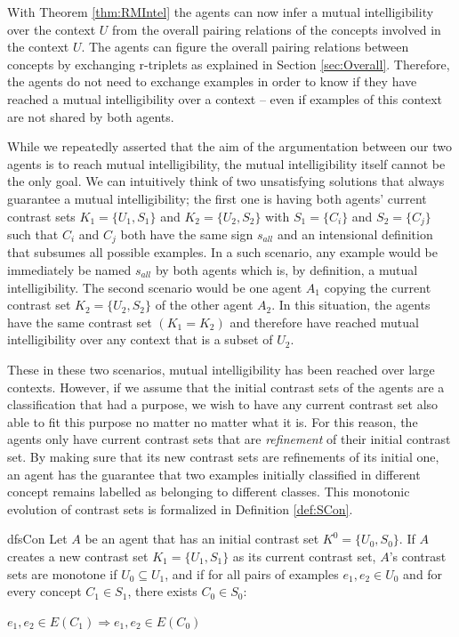 With Theorem \ref{thm:RMIntel} the agents can now infer a mutual intelligibility over the context $U$ from the overall pairing relations of the concepts involved in the context $U$. The agents can figure the overall pairing relations between concepts by exchanging r-triplets as explained in Section \ref{sec:Overall}. Therefore, the agents do not need to exchange examples in order to know if they have reached a mutual intelligibility over a context -- even if examples of this context are not shared by both agents.

While we repeatedly asserted that the aim of the argumentation between our two agents is to reach mutual intelligibility, the mutual intelligibility itself cannot be the only goal. We can intuitively think of two unsatisfying solutions that always guarantee a mutual intelligibility; the first one is having both agents' current contrast sets $K_{1} = \{U_{1}, S_{1} \}$ and $K_{2} = \{U_{2}, S_{2} \}$ with $S_{1} = \{ C_{i} \}$ and $S_{2} = \{ C_{j} \}$ such that $C_{i}$ and $C_{j}$ both have the same sign $s_{all}$ and an intensional definition that subsumes all possible examples. In a such scenario, any example would be immediately be named $s_{all}$ by both agents which is, by definition, a mutual intelligibility. The second scenario would be one agent $A_{1}$ copying the current contrast set $K_{2} = \{U_{2}, S_{2} \}$ of the other agent $A_{2}$. In this situation, the agents have the same contrast set $(K_{1} = K_{2})$ and therefore have reached mutual intelligibility over any context that is a subset of $U_{2}$.

These in these two scenarios, mutual intelligibility has been reached over large contexts. However, if we assume that the initial contrast sets of the agents are a classification that had a purpose, we wish to have any current contrast set also able to fit this purpose no matter no matter what it is. For this reason, the agents only have current contrast sets that are \emph{refinement} of their initial contrast set. By making sure that its new contrast sets are refinements of its initial one, an agent has the guarantee that two examples initially classified in different concept remains labelled as belonging to different classes. This monotonic evolution of contrast sets is formalized in Definition \ref{def:SCon}. 

\begin{restatable}[Monotonicity]{df}{sCon}
\label{def:SCon}
Let $A$ be an agent that has an initial contrast set $K^{0} = \{U_{0}, S_{0} \}$. If $A$ creates a new contrast set $K_{1} = \{U_{1}, S_{1} \}$ as its current contrast set, $A$'s contrast sets are monotone if $U_{0} \subseteq U_{1}$, and if for all pairs of examples $e_{1},e_{2} \in U_{0}$ and for every concept $C_{1} \in S_{1}$, there exists $C_{0} \in S_{0}$:

\begin{center}
$e_{1},e_{2} \in E(C_{1}) \Rightarrow e_{1},e_{2} \in E(C_{0})$
\end{center}

\end{restatable}

